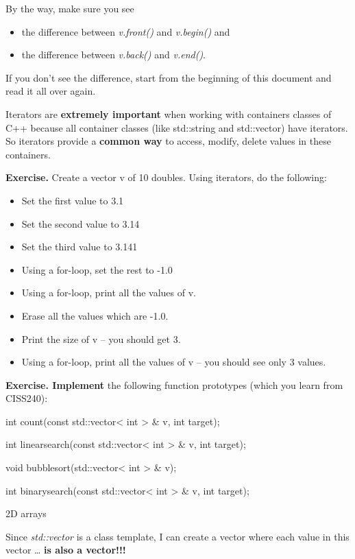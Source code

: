 \documentclass[
]{article}
\providecommand{\tightlist}{%
  \setlength{\itemsep}{0pt}\setlength{\parskip}{0pt}}
\begin{document}
By the way, make sure you see

\begin{itemize}
\tightlist
\item
  the difference between \emph{v.front()} and \emph{v.begin()} and
\item
  the difference between \emph{v.back()} and \emph{v.end()}.
\end{itemize}

If you don't see the difference, start from the beginning of this
document and read it all over again.

Iterators are \textbf{extremely important} when working with containers
classes of C++ because all container classes (like std::string and
std::vector) have iterators. So iterators provide a \textbf{common way}
to access, modify, delete values in these containers.

\textbf{Exercise.} Create a vector v of 10 doubles. Using iterators, do
the following:

\begin{itemize}
\tightlist
\item
  Set the first value to 3.1
\item
  Set the second value to 3.14
\item
  Set the third value to 3.141
\item
  Using a for-loop, set the rest to -1.0
\item
  Using a for-loop, print all the values of v.
\item
  Erase all the values which are -1.0.
\item
  Print the size of v -- you should get 3.
\item
  Using a for-loop, print all the values of v -- you should see only 3
  values.
\end{itemize}

\textbf{Exercise. Implement} the following function prototypes (which
you learn from CISS240):

int count(const std::vector\textless{} int \textgreater{} \& v, int
target);

int linearsearch(const std::vector\textless{} int \textgreater{} \& v,
int target);

void bubblesort(std::vector\textless{} int \textgreater{} \& v);

int binarysearch(const std::vector\textless{} int \textgreater{} \& v,
int target);

2D arrays

Since \emph{std::vector} is a class template, I can create a vector
where each value in this vector \ldots{} \textbf{is also a vector!!!}
\end{document}
